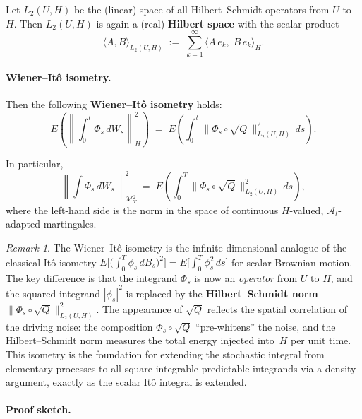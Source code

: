 \documentclass[11pt]{article}
\theoremstyle{definition}
\theoremstyle{remark}
\newtheorem{remark}{Remark}
\begin{document}
Let $L_2(U, H)$ be the (linear) space of all Hilbert--Schmidt operators
from $U$ to $H$.  Then $L_2(U, H)$ is again a (real) \textbf{Hilbert space}
with the scalar product
\[
    \langle A, B \rangle_{L_2(U,H)}
    \;:=\;
    \sum_{k=1}^{\infty}
    \langle A\,e_k,\; B\,e_k \rangle_H.
\]

\paragraph{Wiener--Itô isometry.}

Then the following \textbf{Wiener--Itô isometry} holds:
\[
    E\!\left(
        \left\|\int_0^t \Phi_s\,dW_s\right\|_H^2
    \right)
    \;=\;
    E\!\left(
        \int_0^t
        \bigl\|\Phi_s \circ \sqrt{Q}\,\bigr\|_{L_2(U,H)}^2
        \,ds
    \right).
\]

In particular,
\[
    \left\|\int \Phi_s\,dW_s\right\|_{\mathcal{M}^{2}_{T}}^2
    \;=\;
    E\!\left(
        \int_0^T
        \bigl\|\Phi_s \circ \sqrt{Q}\,\bigr\|_{L_2(U,H)}^2
        \,ds
    \right),
\]
where the left-hand side is the norm in the space of continuous
$H$-valued, $\mathcal{A}_t$-adapted martingales.

\begin{remark}
The Wiener--It\^o isometry is the infinite-dimensional analogue of the classical It\^o isometry $E\!\bigl[\bigl(\int_0^T \phi_s\,dB_s\bigr)^2\bigr] = E\!\bigl[\int_0^T \phi_s^2\,ds\bigr]$ for scalar Brownian motion.  The key difference is that the integrand $\Phi_s$ is now an \emph{operator} from $U$ to $H$, and the squared integrand $|\phi_s|^2$ is replaced by the \textbf{Hilbert--Schmidt norm} $\|\Phi_s \circ \sqrt{Q}\|_{L_2(U,H)}^2$.  The appearance of $\sqrt{Q}$ reflects the spatial correlation of the driving noise: the composition $\Phi_s \circ \sqrt{Q}$ ``pre-whitens'' the noise, and the Hilbert--Schmidt norm measures the total energy injected into~$H$ per unit time.  This isometry is the foundation for extending the stochastic integral from elementary processes to all square-integrable predictable integrands via a density argument, exactly as the scalar It\^o integral is extended.
\end{remark}

\paragraph{Proof sketch.}
\end{document}
